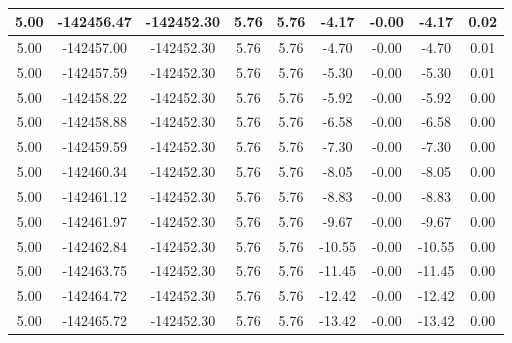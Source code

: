 \begin{table}[htbp]
\begin{adjustbox}{angle=90}
\begin{tabular}{|c|c|c|c|c|c|c|c|c|}
 5.00 & -142456.47 & -142452.30 & 5.76 & 5.76 & -4.17 & -0.00 & -4.17 & 0.02\\ \hline
 5.00 & -142457.00 & -142452.30 & 5.76 & 5.76 & -4.70 & -0.00 & -4.70 & 0.01\\ \hline
 5.00 & -142457.59 & -142452.30 & 5.76 & 5.76 & -5.30 & -0.00 & -5.30 & 0.01\\ \hline
 5.00 & -142458.22 & -142452.30 & 5.76 & 5.76 & -5.92 & -0.00 & -5.92 & 0.00\\ \hline
 5.00 & -142458.88 & -142452.30 & 5.76 & 5.76 & -6.58 & -0.00 & -6.58 & 0.00\\ \hline
 5.00 & -142459.59 & -142452.30 & 5.76 & 5.76 & -7.30 & -0.00 & -7.30 & 0.00\\ \hline
 5.00 & -142460.34 & -142452.30 & 5.76 & 5.76 & -8.05 & -0.00 & -8.05 & 0.00\\ \hline
 5.00 & -142461.12 & -142452.30 & 5.76 & 5.76 & -8.83 & -0.00 & -8.83 & 0.00\\ \hline
 5.00 & -142461.97 & -142452.30 & 5.76 & 5.76 & -9.67 & -0.00 & -9.67 & 0.00\\ \hline
 5.00 & -142462.84 & -142452.30 & 5.76 & 5.76 & -10.55 & -0.00 & -10.55 & 0.00\\ \hline
 5.00 & -142463.75 & -142452.30 & 5.76 & 5.76 & -11.45 & -0.00 & -11.45 & 0.00\\ \hline
 5.00 & -142464.72 & -142452.30 & 5.76 & 5.76 & -12.42 & -0.00 & -12.42 & 0.00\\ \hline
 5.00 & -142465.72 & -142452.30 & 5.76 & 5.76 & -13.42 & -0.00 & -13.42 & 0.00\\ \hline
            \end{tabular}
        \end{adjustbox}
        \caption{}
        \label{}
    \end{table}
    